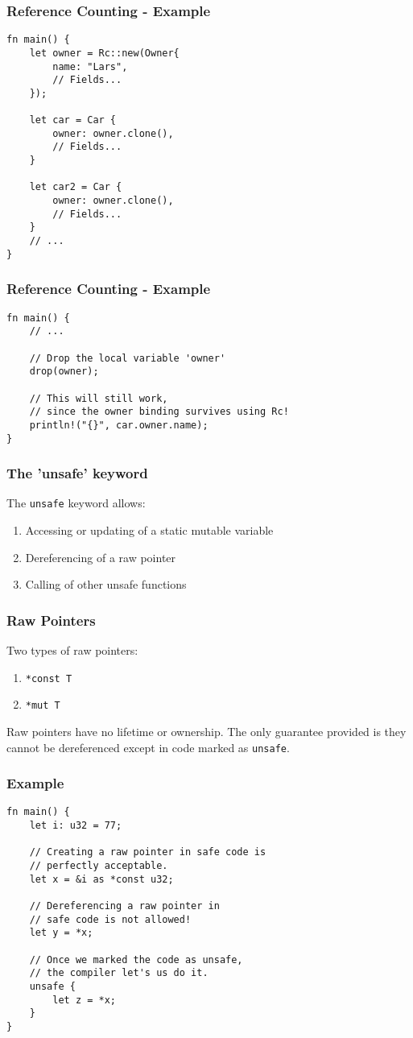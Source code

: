 \documentclass{beamer}
\begin{document}
\begin{frame}[fragile]
	\frametitle{Reference Counting - Example}
	\begin{verbatim}
fn main() {
	let owner = Rc::new(Owner{
		name: "Lars",
		// Fields...
	});

	let car = Car {
		owner: owner.clone(),
		// Fields...
	}

	let car2 = Car {
		owner: owner.clone(),
		// Fields...
	}
	// ...
}
	\end{verbatim}
\end{frame}
\begin{frame}[fragile]
	\frametitle{Reference Counting - Example}
	\begin{verbatim}
fn main() {
	// ...

	// Drop the local variable 'owner'
	drop(owner);

	// This will still work,
	// since the owner binding survives using Rc!
	println!("{}", car.owner.name);
}
	\end{verbatim}
\end{frame}

\begin{frame}
	\frametitle{The 'unsafe' keyword}
	The \texttt{unsafe} keyword allows:
	\begin{enumerate}
		\item Accessing or updating of a static mutable variable
		\item Dereferencing of a raw pointer
		\item Calling of other unsafe functions
	\end{enumerate}
\end{frame}
\begin{frame}[fragile]
	\frametitle{Raw Pointers}
	Two types of raw pointers:
	\begin{enumerate}
		\item \texttt{*const T}
		\item \texttt{*mut T}
	\end{enumerate}
	\vspace{1cm}
	Raw pointers have no lifetime or ownership. The only guarantee provided is they cannot be dereferenced except in code marked as \texttt{unsafe}.
\end{frame}
\begin{frame}[fragile]
	\frametitle{Example}
	\begin{verbatim}
fn main() {
	let i: u32 = 77;

	// Creating a raw pointer in safe code is
	// perfectly acceptable.
	let x = &i as *const u32;

	// Dereferencing a raw pointer in
	// safe code is not allowed!
	let y = *x;

	// Once we marked the code as unsafe,
	// the compiler let's us do it.
	unsafe {
		let z = *x;
	}
}
	\end{verbatim}
\end{frame}
\end{document}
